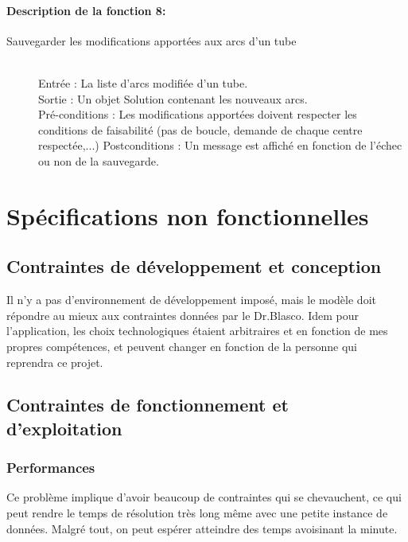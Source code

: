 \documentclass{polytech/polytech}
\numberwithin{figure}{chapter}
\begin{document}
\begin{appendix}
\paragraph{Description de la fonction 8:}

\begin{description}
    \item[Sauvegarder les modifications apportées aux arcs d'un tube] ~ \\
        Entrée : La liste d'arcs modifiée d'un tube.\\ 
        Sortie : Un objet Solution contenant les nouveaux arcs.\\
        Pré-conditions : Les modifications apportées doivent respecter les conditions de faisabilité (pas de boucle, demande de chaque centre respectée,...)
        Postconditions : Un message est affiché en fonction de l'échec ou non de la sauvegarde.
\end{description}

\pagebreak

\section{Spécifications non fonctionnelles}

\subsection{Contraintes de développement et conception}

Il n'y a pas d'environnement de développement imposé, mais le modèle doit répondre au mieux aux contraintes données par le Dr.Blasco.
Idem pour l'application, les choix technologiques étaient arbitraires et en fonction de mes propres compétences, et peuvent changer en fonction de la personne qui reprendra ce projet.

\subsection{Contraintes de fonctionnement et d’exploitation}

\subsubsection{Performances}
Ce problème implique d'avoir beaucoup de contraintes qui se chevauchent, ce qui peut rendre le temps de résolution très long même avec une petite instance de données. Malgré tout, on peut espérer atteindre des temps avoisinant la minute.\\


\end{appendix}
\end{document}
